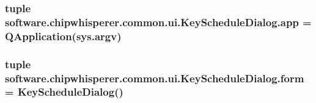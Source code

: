 \subsubsection[{app}]{\setlength{\rightskip}{0pt plus 5cm}tuple software.\+chipwhisperer.\+common.\+ui.\+Key\+Schedule\+Dialog.\+app = Q\+Application(sys.\+argv)}\label{namespacesoftware_1_1chipwhisperer_1_1common_1_1ui_1_1KeyScheduleDialog_a50bdeb1d34b3c23e5bbfe4ac41cc2c7e}
\hypertarget{namespacesoftware_1_1chipwhisperer_1_1common_1_1ui_1_1KeyScheduleDialog_a411eade7ad38e933fe6ee049c33ac274}{}
\subsubsection[{form}]{\setlength{\rightskip}{0pt plus 5cm}tuple software.\+chipwhisperer.\+common.\+ui.\+Key\+Schedule\+Dialog.\+form = {\bf Key\+Schedule\+Dialog}()}\label{namespacesoftware_1_1chipwhisperer_1_1common_1_1ui_1_1KeyScheduleDialog_a411eade7ad38e933fe6ee049c33ac274}
